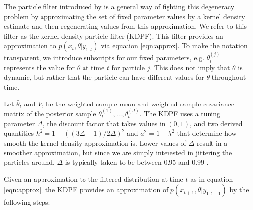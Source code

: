 \documentclass{elsarticle}
\begin{document}
The particle filter introduced by \citet{Liu:West:comb:2001} is a general way of fighting this degeneracy problem by approximating the set of fixed parameter values by a kernel density estimate and then regenerating values from this approximation. We refer to this filter as the kernel density particle filter (KDPF). This filter provides an approximation to $p(x_t,\theta| y_{1:t})$ via equation \eqref{eqn:approx}. To make the notation transparent, we introduce subscripts for our fixed parameters, e.g. $\theta_t^{(j)}$ represents the value for $\theta$ at time $t$ for particle $j$. This does not imply that $\theta$ is dynamic, but rather that the particle can have different values for $\theta$ throughout time.

Let $\bar{\theta}_t$ and $V_t$ be the weighted sample mean and weighted sample covariance matrix of the posterior sample $\theta_t^{(1)},\ldots,\theta_t^{(J)}$.  The KDPF uses a tuning parameter $\Delta$, the discount factor that takes values in $(0,1)$, and two derived quantities $h^2 = 1 - ((3\Delta - 1)/2\Delta)^2$ and $a^2 = 1 - h^2$ that determine how smooth the kernel density approximation is. Lower values of $\Delta$ result in a smoother approximation, but since we are simply interested in jittering the particles around, $\Delta$ is typically taken to be between 0.95 and 0.99 \citep{Liu:West:comb:2001}.

Given an approximation to the filtered distribution at time $t$ as in equation \eqref{eqn:approx}, the KDPF provides an approximation of $p(x_{t+1},\theta|y_{1:t+1})$ by the following steps:
\end{document}
